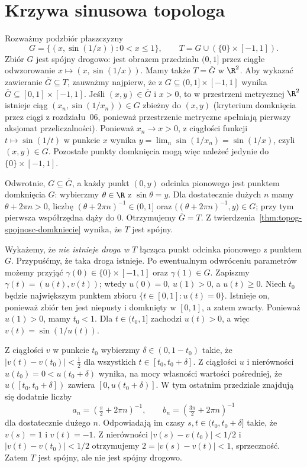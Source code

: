 \section{Krzywa sinusowa topologa}
\label{sec:topog-spojnosc-sinus}

\begin{przyklad}
\label{ex:topog-spojnosc-sinus}
Rozważmy podzbiór płaszczyzny
\[
G=\{(x,\sin(1/x)):0<x\le1\},\qquad
T=G\cup(\{0\}\times[-1,1]).
\]
Zbiór $G$ jest spójny drogowo: jest obrazem
przedziału $(0,1]$ przez ciągłe odwzorowanie
$x\mapsto(x,\sin(1/x))$. Mamy także
$T=\overline G$ w $\R^2$. Aby wykazać zawieranie
$\overline G\subseteq T$, zauważmy najpierw,
że z $G\subseteq(0,1]\times[-1,1]$ wynika
$\overline G\subseteq[0,1]\times[-1,1]$.
Jeśli $(x,y)\in\overline G$ i $x>0$, to
w przestrzeni metrycznej $\R^2$ istnieje ciąg
$(x_n,\sin(1/x_n))\in G$ zbieżny do $(x,y)$
(kryterium domknięcia przez ciągi z rozdziału~06,
ponieważ przestrzenie metryczne spełniają pierwszy aksjomat
przeliczalności). Ponieważ $x_n\to x>0$,
z ciągłości funkcji $t\mapsto\sin(1/t)$
w punkcie $x$ wynika
$y=\lim_n\sin(1/x_n)=\sin(1/x)$, czyli
$(x,y)\in G$. Pozostałe punkty domknięcia
mogą więc należeć jedynie do
$\{0\}\times[-1,1]$.

Odwrotnie, $G\subseteq\overline G$, a każdy
punkt $(0,y)$ odcinka pionowego jest punktem
domknięcia $G$: wybierzmy $\theta\in\R$
z $\sin\theta=y$. Dla dostatecznie dużych $n$
mamy $\theta+2\pi n>0$, liczbę
$(\theta+2\pi n)^{-1}\in(0,1]$ oraz
$\bigl((\theta+2\pi n)^{-1},y\bigr)\in G$;
przy tym pierwsza współrzędna dąży do $0$.
Otrzymujemy $\overline G=T$.
Z twierdzenia~\ref{thm:topog-spojnosc-domkniecie}
wynika, że $T$ jest spójny.

Wykażemy, że \emph{nie istnieje droga w $T$}
łącząca punkt odcinka pionowego z punktem $G$.
Przypuśćmy, że taka droga istnieje.
Po ewentualnym odwróceniu parametrów możemy
przyjąć $\gamma(0)\in\{0\}\times[-1,1]$
oraz $\gamma(1)\in G$.
Zapiszmy $\gamma(t)=(u(t),v(t))$; wtedy
$u(0)=0$, $u(1)>0$, a $u(t)\ge0$.
Niech $t_0$ będzie największym punktem
zbioru $\{t\in[0,1]:u(t)=0\}$.
Istnieje on, ponieważ zbiór ten jest
niepusty i domknięty w $[0,1]$, a zatem
zwarty. Ponieważ $u(1)>0$, mamy $t_0<1$.
Dla $t\in(t_0,1]$ zachodzi $u(t)>0$,
a więc $v(t)=\sin(1/u(t))$.

Z ciągłości $v$ w punkcie $t_0$
wybierzmy $\delta\in(0,1-t_0)$ takie,
że $|v(t)-v(t_0)|<\tfrac12$ dla wszystkich
$t\in[t_0,t_0+\delta]$. Z ciągłości $u$
i nierówności $u(t_0)=0<u(t_0+\delta)$
wynika, na mocy własności wartości pośredniej,
że $u([t_0,t_0+\delta])$ zawiera
$[0,u(t_0+\delta)]$. W tym ostatnim
przedziale znajdują się dodatnie liczby
\[
a_n=(\tfrac\pi2+2\pi n)^{-1},\qquad
b_n=(\tfrac{3\pi}2+2\pi n)^{-1}
\]
dla dostatecznie dużego $n$.
Odpowiadają im czasy $s,t\in(t_0,t_0+\delta]$
takie, że $v(s)=1$ i $v(t)=-1$.
Z nierówności $|v(s)-v(t_0)|<1/2$
i $|v(t)-v(t_0)|<1/2$ otrzymujemy
$2=|v(s)-v(t)|<1$, sprzeczność.
Zatem $T$ jest spójny, ale nie jest
spójny drogowo.


\end{przyklad}
